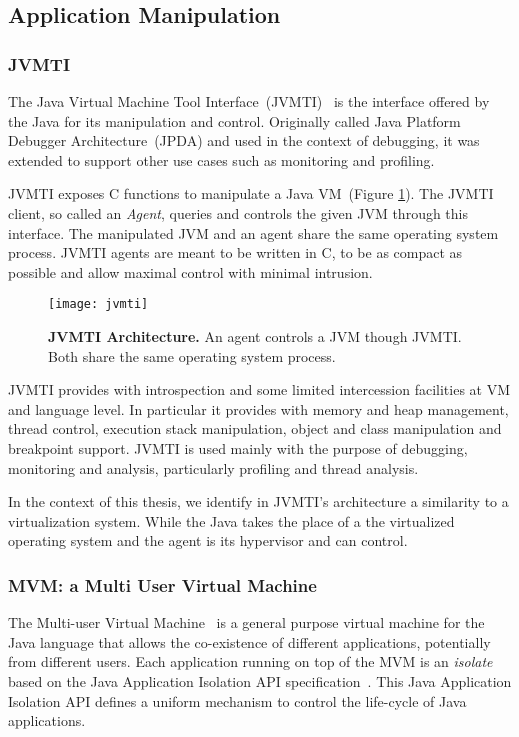 \subsection{Application Manipulation}\label{sec:virtualization_control}

\subsubsection*{JVMTI}
The Java Virtual Machine Tool Interface~(JVMTI)~\cite{JVMPI} is the interface offered by the Java \VM for its manipulation and control. Originally called Java Platform Debugger Architecture~(JPDA) and used in the context of debugging, it was extended to support other use cases such as monitoring and profiling.

JVMTI exposes C functions to manipulate a Java VM~(Figure \ref{fig:jvmti}). The JVMTI client, so called an \emph{Agent}, queries and controls the given JVM through this interface. The manipulated JVM and an agent share the same operating system process. JVMTI agents are meant to be written in C, to be as compact as possible and allow maximal control with minimal intrusion.

\begin{figure}[ht]
\begin{center}
\texttt{[image: jvmti]}
\caption{\textbf{JVMTI Architecture.} An agent controls a JVM though JVMTI. Both share the same operating system process.\label{fig:jvmti}}
\end{center}
\end{figure}

JVMTI provides with introspection and some limited intercession facilities at VM and language level. In particular it provides with memory and heap management, thread control, execution stack manipulation, object and class manipulation and breakpoint support. JVMTI is used mainly with the purpose of debugging, monitoring and analysis, particularly profiling and thread analysis.

In the context of this thesis, we identify in JVMTI's architecture a similarity to a virtualization system. While the Java \VM takes the place of a the virtualized operating system and the agent is its hypervisor and can control.

\subsubsection*{MVM: a Multi User Virtual Machine}
The Multi-user Virtual Machine~\cite{Czaj03a,Czaj01a} is a general purpose virtual machine for the Java language that allows the co-existence of different applications, potentially from different users. Each application running on top of the MVM is an \emph{isolate} based on the Java Application Isolation API specification~\cite{JSR121}. This Java Application Isolation API defines a uniform mechanism to control the life-cycle of Java applications.

